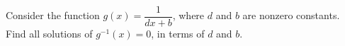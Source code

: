 Consider the function $g(x)=\dfrac{1}{dx+b}$, where $d$ and $b$ are nonzero constants. Find all solutions of $g^{-1}(x)=0$, in terms of $d$ and $b$.
